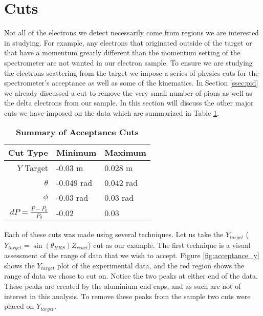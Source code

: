 
\section{Cuts}
\label{sec:cuts}

Not all of the electrons we detect necessarily come from regions we are interested in studying. For example, any electrons that originated outside of the target or that have a momentum greatly different than the momentum setting of the spectrometer are not wanted in our electron sample. To ensure we are studying the electrons scattering from the target we impose a series of physics cuts for the spectrometer's acceptance as well as some of the kinematics. In Section \ref{ssec:pid} we already discussed a cut to remove the very small number of pions as well as the delta electrons from our sample. In this section will discuss the other major cuts we have imposed on the data which are summarized in Table \ref{tab:cuts}. 

\vspace{5mm}

\begin{table}[!h]
\centering
\begin{tabular}{|r | l l|}
\hline
\textbf{Cut Type} & \textbf{Minimum} & \textbf{Maximum}\\
\hline
$Y$ Target & -0.03 m & 0.028 m\\ 
$\theta$ & -0.049 rad & 0.042 rad\\ 
$\phi$ & -0.03 rad & 0.03 rad\\ 
$dP = \frac{P-P_0}{P_0}$ & -0.02 & 0.03\\ 
\hline
\end{tabular}
\caption[Summary of Acceptance Cuts]{{\bf{Summary of Acceptance Cuts}} }
\label{tab:cuts}
\end{table}

Each of these cuts was made using several techniques. Let us take the $Y_{target}$ ($Y_{target}=\sin\left(\theta_{HRS}\right)Z_{react}$) cut as our example. The first technique is a visual assessment of the range of data that we wish to accept. Figure \ref{fig:acceptance_y} shows the $Y_{target}$ plot of the experimental data, and the red region shows the range of data we chose to cut on. Notice the two peaks at either end of the data. These peaks are created by the aluminium end caps, and as such are not of interest in this analysis. To remove these peaks from the sample two cuts were placed on $Y_{target}$. 

